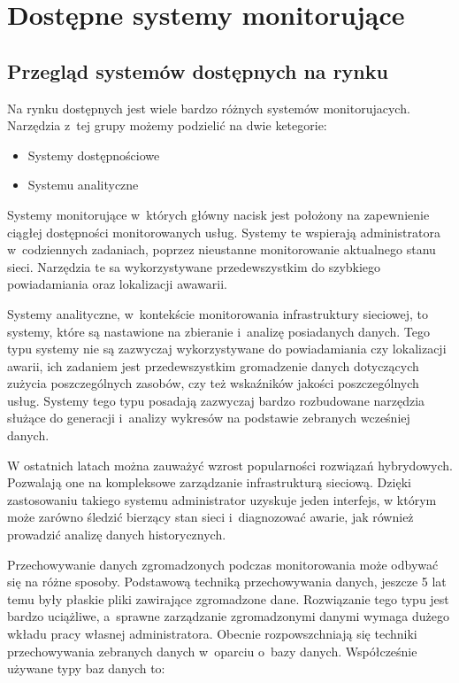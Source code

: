 \chapter{Dostępne systemy monitorujące}
\label{chap:Systemy}

\section[Przegląd systemów][Przegląd systemów dostępnych na rynku]{Przegląd systemów dostępnych na rynku}

Na rynku dostępnych jest wiele bardzo różnych systemów
monitorujacych. Narzędzia z~tej grupy możemy podzielić na dwie
ketegorie:

\begin{itemize}
\item Systemy dostępnościowe
\item Systemu analityczne
\end{itemize}

Systemy monitorujące w~których główny nacisk jest położony na
zapewnienie ciągłej dostępności monitorowanych usług. Systemy te
wspierają administratora w~codziennych zadaniach, poprzez nieustanne
monitorowanie aktualnego stanu sieci. Narzędzia te sa wykorzystywane
przedewszystkim do szybkiego powiadamiania oraz lokalizacji awawarii.

Systemy analityczne, w~kontekście monitorowania infrastruktury
sieciowej, to systemy, które są nastawione na zbieranie i~analizę
posiadanych danych. Tego typu systemy nie są zazwyczaj wykorzystywane
do powiadamiania czy lokalizacji awarii, ich zadaniem jest
przedewszystkim gromadzenie danych dotyczących zużycia poszczególnych
zasobów, czy też wskaźników jakości poszczególnych usług. Systemy tego
typu posadają zazwyczaj bardzo rozbudowane narzędzia służące do
generacji i~analizy wykresów na podstawie zebranych wcześniej danych.

W ostatnich latach można zauważyć wzrost popularności rozwiązań
hybrydowych. Pozwalają one na kompleksowe zarządzanie infrastrukturą
sieciową. Dzięki zastosowaniu takiego systemu administrator uzyskuje
jeden interfejs, w którym może zarówno śledzić bierzący stan sieci
i~diagnozować awarie, jak również prowadzić analizę danych
historycznych.

Przechowywanie danych zgromadzonych podczas monitorowania może odbywać
się na różne sposoby. Podstawową techniką przechowywania danych,
jeszcze 5 lat temu były płaskie pliki zawirające zgromadzone
dane. Rozwiązanie tego typu jest bardzo uciążliwe, a~sprawne
zarządzanie zgromadzonymi danymi wymaga dużego wkładu pracy własnej
administratora. Obecnie rozpowszchniają się techniki przechowywania
zebranych danych w~oparciu o~bazy danych. Współcześnie używane typy baz danych to:

